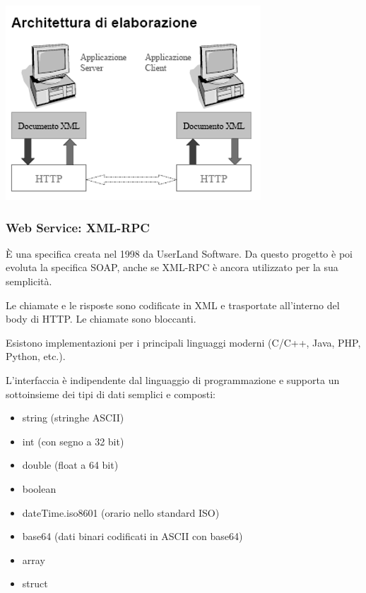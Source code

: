         \begin{center}
            \includegraphics[scale=0.6]{chapters/6/assets/schema_y.png}
        \end{center}

        \subsubsection{Web Service: XML-RPC}
            È una specifica creata nel 1998 da UserLand Software. Da questo progetto è poi evoluta la specifica SOAP, anche se XML-RPC è ancora utilizzato per la sua semplicità.
        
            Le chiamate e le risposte sono codificate in XML e trasportate all'interno del body di HTTP. Le chiamate sono bloccanti.
        
            Esistono implementazioni per i principali linguaggi moderni (C/C++, Java, PHP, Python, etc.).
        
            L'interfaccia è indipendente dal linguaggio di programmazione e supporta un sottoinsieme dei tipi di dati semplici e composti:
            \begin{itemize}
                \item string (stringhe ASCII)
                \item int (con segno a 32 bit)
                \item double (float a 64 bit)
                \item boolean
                \item dateTime.iso8601 (orario nello standard ISO)
                \item base64 (dati binari codificati in ASCII con base64)
                \item array
                \item struct
            \end{itemize}

